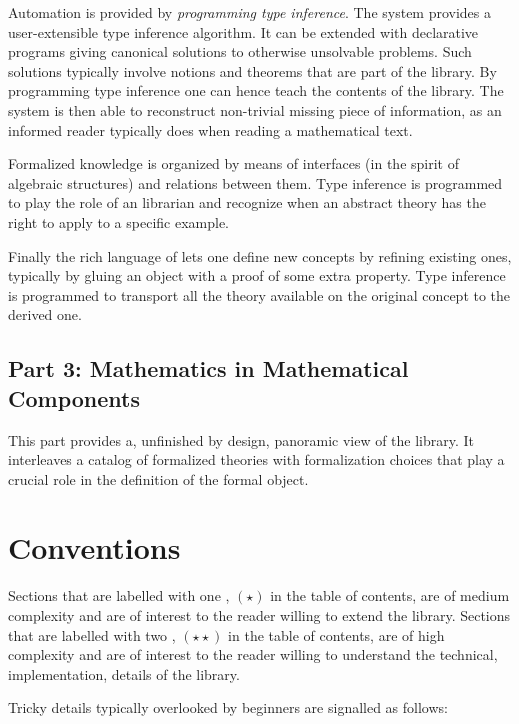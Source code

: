 Automation is provided by \emph{programming type inference}.
The \Coq{} system provides a user-extensible type inference
algorithm.  It can be extended with declarative programs
giving canonical solutions to otherwise unsolvable problems.
Such solutions typically involve notions and theorems that
are part of the \mcbMC{} library.  By programming type inference
one can hence teach \Coq{} the contents of the library.  The system
is then able to reconstruct non-trivial missing piece of information,
as an informed reader typically does when reading a mathematical text.

Formalized knowledge is organized by means of interfaces (in the spirit of
algebraic structures) and relations between them.  Type inference is programmed
to play the role of an librarian and recognize when an abstract theory has the
right to apply to a specific example.

Finally the rich language of \Coq{} lets one define new concepts
by refining existing ones, typically by gluing an object with
a proof of some extra property.  Type inference is programmed
to transport all the theory available on
the original concept to the derived one.

\subsection{Part 3: Mathematics in Mathematical Components}

This part provides a, unfinished by design, panoramic view of the
\mcbMC{} library.  It interleaves a catalog of formalized theories with
formalization choices that play a crucial role in the
definition of the formal object.

\section{Conventions}

Sections that are labelled with one \coqhead{0.3cm}, $(\star)$ in the table of
contents, are of medium complexity and are of interest to the reader willing
to extend the \mcbMC{} library.  Sections that are labelled with two
\coqhead{0.3cm}\coqhead{0.3cm}, $(\star\star)$ in the table of
contents, are of high complexity and are of interest to the reader willing
to understand the technical, implementation, details of the \mcbMC{} library.

Tricky details typically overlooked by beginners are signalled as follows:

